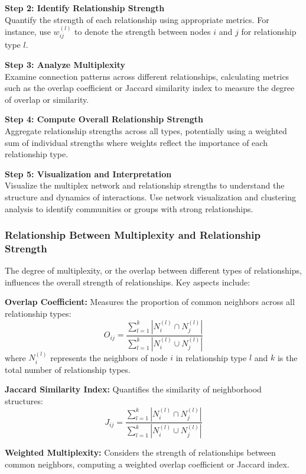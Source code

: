 \documentclass[12pt]{book} %
\begin{document}
\textbf{Step 2: Identify Relationship Strength} \\
Quantify the strength of each relationship using appropriate metrics. For instance, use \(w_{ij}^{(l)}\) to denote the strength between nodes \(i\) and \(j\) for relationship type \(l\).

\textbf{Step 3: Analyze Multiplexity} \\
Examine connection patterns across different relationships, calculating metrics such as the overlap coefficient or Jaccard similarity index to measure the degree of overlap or similarity.

\textbf{Step 4: Compute Overall Relationship Strength} \\
Aggregate relationship strengths across all types, potentially using a weighted sum of individual strengths where weights reflect the importance of each relationship type.

\textbf{Step 5: Visualization and Interpretation} \\
Visualize the multiplex network and relationship strengths to understand the structure and dynamics of interactions. Use network visualization and clustering analysis to identify communities or groups with strong relationships.

\subsubsection{Relationship Between Multiplexity and Relationship Strength}

The degree of multiplexity, or the overlap between different types of relationships, influences the overall strength of relationships. Key aspects include:

\textbf{Overlap Coefficient:} Measures the proportion of common neighbors across all relationship types:
\[
O_{ij} = \frac{\sum_{l=1}^{k} |N_i^{(l)} \cap N_j^{(l)}|}{\sum_{l=1}^{k} |N_i^{(l)} \cup N_j^{(l)}|}
\]
where \(N_i^{(l)}\) represents the neighbors of node \(i\) in relationship type \(l\) and \(k\) is the total number of relationship types.

\textbf{Jaccard Similarity Index:} Quantifies the similarity of neighborhood structures:
\[
J_{ij} = \frac{\sum_{l=1}^{k} |N_i^{(l)} \cap N_j^{(l)}|}{\sum_{l=1}^{k} |N_i^{(l)} \cup N_j^{(l)}|}
\]

\textbf{Weighted Multiplexity:} Considers the strength of relationships between common neighbors, computing a weighted overlap coefficient or Jaccard index.
\end{document}
